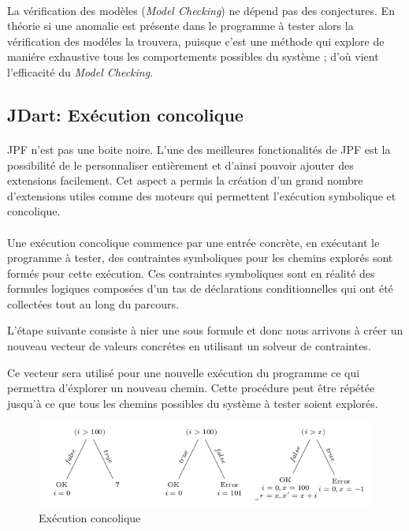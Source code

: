 			\paragraph{}
				La vérification des modèles (\textit{Model Checking}) ne dépend pas des conjectures. En théorie si une anomalie est présente dans le programme à tester
				alors la vérification des modéles la trouvera, puisque c'est une méthode qui explore de maniére exhaustive tous les comportements possibles du système ;
				d'où vient l'efficacité du \textit{Model Checking}.
		\subsection{JDart: Exécution concolique}
			\nocite{JDart}
			\nocite{JDart2}

			\paragraph{}
				\gls{JPF} n'est pas une boite noire. L'une des meilleures fonctionalités de \gls{JPF} est la possibilité de le personnaliser entièrement et d'ainsi pouvoir ajouter des extensions facilement.
				Cet aspect a permis la création d'un grand nombre d'extensions utiles comme des moteurs
				qui permettent l'exécution symbolique et concolique.

			\paragraph{}
				Une exécution concolique commence par une entrée concrète, en exécutant le programme à tester, des contraintes symboliques pour les chemins explorés
				sont formés pour cette exécution. Ces contraintes symboliques sont en réalité des formules logiques composées d'un tas de déclarations conditionnelles
				qui ont été collectées tout au long du parcours.

				L'étape suivante consiste à nier une sous formule et donc nous arrivons à créer un nouveau vecteur de valeurs concrétes en utilisant un
				solveur de contraintes.

				Ce vecteur sera utilisé pour une nouvelle exécution du programme ce qui permettra d'éxplorer un nouveau chemin.
				Cette procédure peut être répétée jusqu'à ce que tous les chemins possibles du système à tester soient explorés.
				
			\begin{figure}[H]
				\centering
					\includegraphics[scale=0.5]{images/concolic.png}
				\caption{Exécution concolique}
			\end{figure}
				
